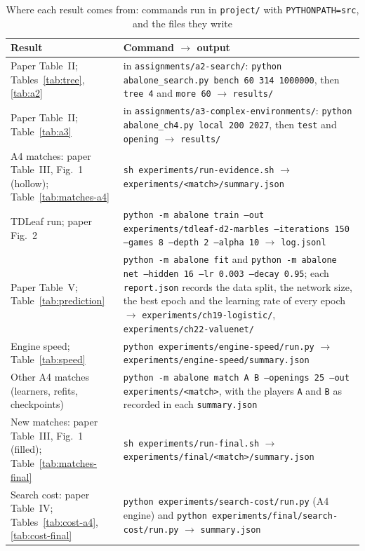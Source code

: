 \documentclass[a4paper,10pt]{article}
\begin{document}
\begin{table}[!htbp]
\centering\caption{Where each result comes from: commands run in \texttt{project/} with \texttt{PYTHONPATH=src}, and
the files they write}\label{tab:repro}
\footnotesize
\begin{tabular}{@{}>{\raggedright\arraybackslash}p{3.3cm}>{\raggedright\arraybackslash}p{13.0cm}@{}}
\toprule
Result & Command $\rightarrow$ output \\
\midrule
Paper Table~II; Tables~\ref{tab:tree}, \ref{tab:a2} & in \texttt{assignments/a2-search/}: \texttt{python abalone\_search.py bench 60 314 1000000}, then \texttt{tree 4} and \texttt{more 60} $\rightarrow$ \texttt{results/} \\
Paper Table~II; Table~\ref{tab:a3} & in \texttt{assignments/a3-complex-environments/}: \texttt{python abalone\_ch4.py local 200 2027}, then \texttt{test} and \texttt{opening} $\rightarrow$ \texttt{results/} \\
A4 matches: paper Table~III, Fig.~1 (hollow); Table~\ref{tab:matches-a4} & \texttt{sh experiments/run-evidence.sh} $\rightarrow$ \texttt{experiments/<match>/summary.json} \\
TDLeaf run; paper Fig.~2 & \texttt{python -m abalone train --out experiments/tdleaf-d2-marbles --iterations 150 --games 8 --depth 2 --alpha 10} $\rightarrow$ \texttt{log.jsonl} \\
Paper Table~V; Table~\ref{tab:prediction} & \texttt{python -m abalone fit} and \texttt{python -m abalone net --hidden 16 --lr 0.003 --decay 0.95}; each \texttt{report.json} records the data split, the network size, the best epoch and the learning rate of every epoch $\rightarrow$ \texttt{experiments/ch19-logistic/}, \texttt{experiments/ch22-valuenet/} \\
Engine speed; Table~\ref{tab:speed} & \texttt{python experiments/engine-speed/run.py} $\rightarrow$ \texttt{experiments/engine-speed/summary.json} \\
Other A4 matches (learners, refits, checkpoints) & \texttt{python -m abalone match A B --openings 25 --out experiments/<match>}, with the players \texttt{A} and \texttt{B} as recorded in each \texttt{summary.json} \\
New matches: paper Table~III, Fig.~1 (filled); Table~\ref{tab:matches-final} & \texttt{sh experiments/run-final.sh} $\rightarrow$ \texttt{experiments/final/<match>/summary.json} \\
Search cost: paper Table~IV; Tables~\ref{tab:cost-a4}, \ref{tab:cost-final} & \texttt{python experiments/search-cost/run.py} (A4 engine) and \texttt{python experiments/final/search-cost/run.py} $\rightarrow$ \texttt{summary.json} \\

\end{tabular}
\end{table}
\end{document}
